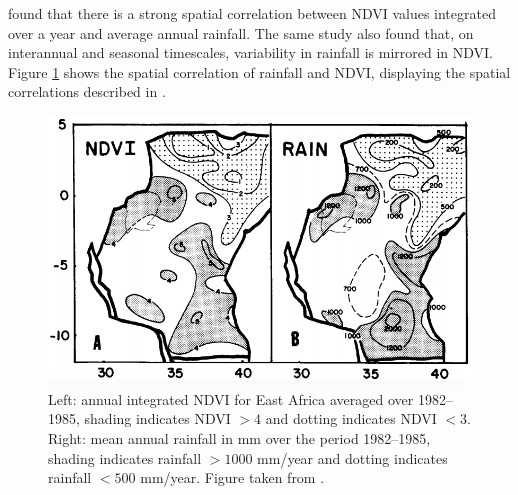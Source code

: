 \cite{nicholson1990} found that there is a strong spatial correlation between
NDVI values integrated over a year and average annual rainfall. The same study
also found that, on interannual and seasonal timescales, variability in rainfall
is mirrored in NDVI. Figure \ref{fig:ndvi_rain} shows the spatial correlation of
rainfall and NDVI, displaying the spatial correlations described in
\cite{nicholson1990}.
\begin{figure}
  \centering
  \includegraphics[width=0.9\linewidth]{figures/ndvi_rain}
  \caption{Left: annual integrated NDVI for East Africa averaged over 1982--1985,
    shading indicates NDVI ${>}4$ and dotting indicates NDVI ${<}3$. Right: mean
    annual rainfall in mm over the period 1982--1985, shading indicates rainfall
    ${>}1000$ mm/year and dotting indicates rainfall ${<}500$ mm/year. Figure
    taken from \cite{nicholson1990}.}
  \label{fig:ndvi_rain}
\end{figure}
